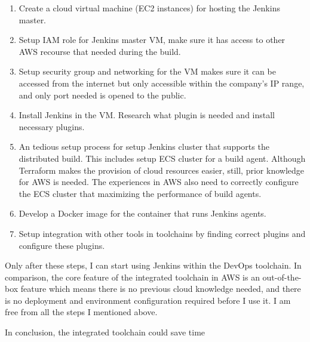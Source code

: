 \begin{enumerate} 
 \item Create a cloud virtual machine (EC2 instances) for hosting the Jenkins master.
 \item Setup IAM role for Jenkins master VM, make sure it has access to other AWS recourse that needed during the build.
 \item Setup security group and networking for the VM makes sure it can be accessed from the internet but only accessible within the company's IP range, and only port needed is opened to the public.
 \item Install Jenkins in the VM. Research what plugin is needed and install necessary plugins.
 \item An tedious setup process for setup Jenkins cluster that supports the distributed build. This includes setup ECS cluster for a build agent. Although Terraform makes the provision of cloud resources easier, still, prior knowledge for AWS is needed. The experiences in AWS also need to correctly configure the ECS cluster that maximizing the performance of build agents.
 \item Develop a Docker image for the container that runs Jenkins agents.
 \item Setup integration with other tools in toolchains by finding correct plugins and configure these plugins. 
\end{enumerate}
Only after these steps, I can start using Jenkins within the DevOps toolchain.
In comparison, the core feature of the integrated toolchain in AWS is an out-of-the-box feature which means there is no previous cloud knowledge needed, and there is no deployment and environment configuration required before I use it. I am free from all the steps I mentioned above. 
\par
In conclusion, the integrated toolchain could save time
